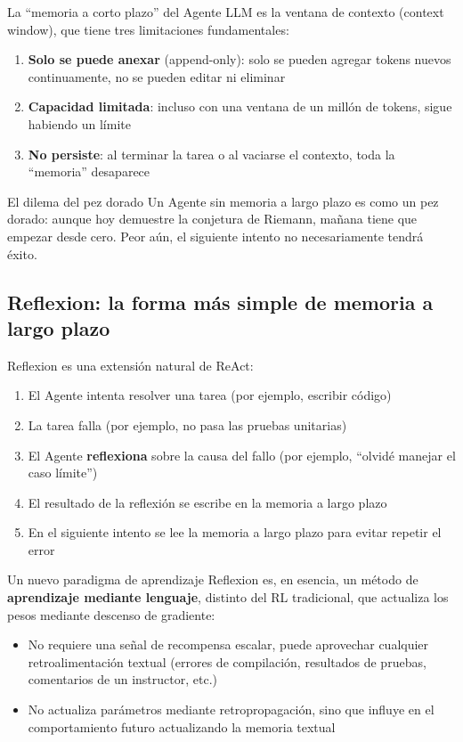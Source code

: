 \documentclass[a4paper]{article}
\begin{document}
La ``memoria a corto plazo'' del Agente LLM es la ventana de contexto (context window), que tiene tres limitaciones fundamentales:

\begin{enumerate}
    \item \textbf{Solo se puede anexar} (append-only): solo se pueden agregar tokens nuevos continuamente, no se pueden editar ni eliminar
    \item \textbf{Capacidad limitada}: incluso con una ventana de un millón de tokens, sigue habiendo un límite
    \item \textbf{No persiste}: al terminar la tarea o al vaciarse el contexto, toda la ``memoria'' desaparece
\end{enumerate}

\begin{warningbox}{El dilema del pez dorado}
Un Agente sin memoria a largo plazo es como un pez dorado: aunque hoy demuestre la conjetura de Riemann, mañana tiene que empezar desde cero. Peor aún, el siguiente intento no necesariamente tendrá éxito.
\end{warningbox}

\subsection{Reflexion: la forma más simple de memoria a largo plazo}

Reflexion es una extensión natural de ReAct:

\begin{enumerate}
    \item El Agente intenta resolver una tarea (por ejemplo, escribir código)
    \item La tarea falla (por ejemplo, no pasa las pruebas unitarias)
    \item El Agente \textbf{reflexiona} sobre la causa del fallo (por ejemplo, ``olvidé manejar el caso límite'')
    \item El resultado de la reflexión se escribe en la memoria a largo plazo
    \item En el siguiente intento se lee la memoria a largo plazo para evitar repetir el error
\end{enumerate}

\begin{knowledgebox}{Un nuevo paradigma de aprendizaje}
Reflexion es, en esencia, un método de \textbf{aprendizaje mediante lenguaje}, distinto del RL tradicional, que actualiza los pesos mediante descenso de gradiente:
\begin{itemize}
    \item No requiere una señal de recompensa escalar, puede aprovechar cualquier retroalimentación textual (errores de compilación, resultados de pruebas, comentarios de un instructor, etc.)
    \item No actualiza parámetros mediante retropropagación, sino que influye en el comportamiento futuro actualizando la memoria textual
\end{itemize}
\end{knowledgebox}
\end{document}
